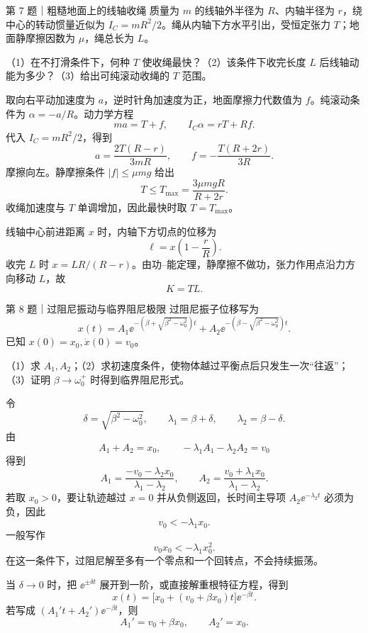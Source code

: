 \begin{problem}{第 7 题｜粗糙地面上的线轴收绳}
质量为 $m$ 的线轴外半径为 $R$、内轴半径为 $r$，绕中心的转动惯量近似为 $I_C=mR^2/2$。绳从内轴下方水平引出，受恒定张力 $T$；地面静摩擦因数为 $\mu$，绳总长为 $L$。

（1）在不打滑条件下，何种 $T$ 使收绳最快？（2）该条件下收完长度 $L$ 后线轴动能为多少？（3）给出可纯滚动收绳的 $T$ 范围。
\FigSpool
\end{problem}
\begin{solution}
取向右平动加速度为 $a$，逆时针角加速度为正，地面摩擦力代数值为 $f$。纯滚动条件为 $\alpha=-a/R$。动力学方程
\[
ma=T+f,
\qquad
I_C\alpha=rT+Rf.
\]
代入 $I_C=mR^2/2$，得到
\[
a=\frac{2T(R-r)}{3mR},
\qquad
f=-\frac{T(R+2r)}{3R}.
\]
摩擦向左。静摩擦条件 $|f|\le\mu mg$ 给出
\[
T\le T_{\max}=\frac{3\mu mgR}{R+2r}.
\]
收绳加速度与 $T$ 单调增加，因此最快时取 $T=T_{\max}$。

线轴中心前进距离 $x$ 时，内轴下方切点的位移为
\[
\ell=x\left(1-\frac rR\right).
\]
收完 $L$ 时 $x=LR/(R-r)$。由功--能定理，静摩擦不做功，张力作用点沿力方向移动 $L$，故
\[
K=TL.
\]
\end{solution}

\begin{problem}{第 8 题｜过阻尼振动与临界阻尼极限}
过阻尼振子位移写为
\[
x(t)=A_1\ee^{-(\beta+\sqrt{\beta^2-\omega_0^2})t}
+A_2\ee^{-(\beta-\sqrt{\beta^2-\omega_0^2})t}.
\]
已知 $x(0)=x_0,\dot x(0)=v_0$。

（1）求 $A_1,A_2$；（2）求初速度条件，使物体越过平衡点后只发生一次“往返”；（3）证明 $\beta\to\omega_0^+$ 时得到临界阻尼形式。
\end{problem}
\begin{solution}
令
\[
\delta=\sqrt{\beta^2-\omega_0^2},
\qquad
\lambda_1=\beta+\delta,
\qquad
\lambda_2=\beta-\delta.
\]
由
\[
A_1+A_2=x_0,
\qquad
-\lambda_1A_1-\lambda_2A_2=v_0
\]
得到
\[
A_1=\frac{-v_0-\lambda_2x_0}{\lambda_1-\lambda_2},
\qquad
A_2=\frac{v_0+\lambda_1x_0}{\lambda_1-\lambda_2}.
\]
若取 $x_0>0$，要让轨迹越过 $x=0$ 并从负侧返回，长时间主导项 $A_2\ee^{-\lambda_2t}$ 必须为负，因此
\[
v_0<-\lambda_1x_0.
\]
一般写作
\[
v_0x_0<-\lambda_1x_0^2.
\]
在这一条件下，过阻尼解至多有一个零点和一个回转点，不会持续振荡。

当 $\delta\to0$ 时，把 $\ee^{\pm\delta t}$ 展开到一阶，或直接解重根特征方程，得到
\[
\boxed{x(t)=\bigl[x_0+(v_0+\beta x_0)t\bigr]\ee^{-\beta t}}.
\]
若写成 $(A_1't+A_2')\ee^{-\beta t}$，则
\[
A_1'=v_0+\beta x_0,
\qquad A_2'=x_0.
\]
\end{solution}

